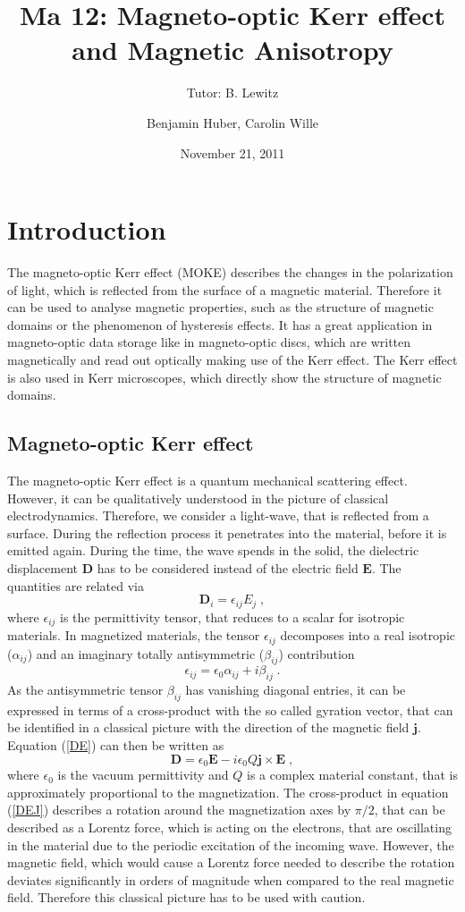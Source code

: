 \documentclass[a4paper]{scrartcl}
\title{Ma 12: Magneto-optic Kerr effect and Magnetic Anisotropy}
\subtitle{Tutor: B. Lewitz}
\author{Benjamin Huber, Carolin Wille}
\date{November 21, 2011}
\numberwithin{equation}{section}
\numberwithin{figure}{section}
\numberwithin{table}{section}
\newcommand{\eq}[2]{\begin{equation}#1\label{#2}\end{equation}}
\newcommand{\Formel}[1]{(\ref{#1})}
\newcommand{\ve}[1]{\mathbf{ #1} }
\begin{document}
\thispagestyle{empty}
\maketitle
\tableofcontents
\clearpage


\section{Introduction}
The magneto-optic Kerr effect (MOKE) describes the changes in the polarization of light, which is reflected from the surface of a magnetic material. Therefore it can be used to analyse magnetic properties, such as the structure of magnetic domains or the phenomenon of hysteresis effects. It has a great application in magneto-optic data storage like in magneto-optic discs, which are written magnetically and read out optically making use of the Kerr effect. The Kerr effect is also used in Kerr microscopes, which directly show the structure of magnetic domains.

\subsection{Magneto-optic Kerr effect}
The magneto-optic Kerr effect is a quantum mechanical scattering effect. However, it can be qualitatively understood in the picture of classical electrodynamics. Therefore, we consider a light-wave, that is reflected from a surface. During the reflection process it
 penetrates into the material, before it is emitted again. During the time, the wave spends in the solid, the dielectric displacement $\ve D $ has to be considered instead of the electric field $\ve E$. The quantities are related via
\eq{\ve D_i = \epsilon_{ij} E_j \;, } {DE}
where $ \epsilon_{ij}$ is the permittivity tensor, that reduces to a scalar for isotropic materials. In magnetized materials, the tensor $\epsilon_{ij}$ decomposes into a real isotropic ($\alpha_{ij}$) and an imaginary totally antisymmetric ($\beta_{ij}$) contribution
\eq{\epsilon_{ij} = \epsilon_0 \alpha_{ij} + i \beta_{ij} \; . }{eps}
As the antisymmetric tensor $\beta_{ij}$ has vanishing diagonal entries, it can be expressed in terms of a cross-product with the so called gyration vector, that can be identified in a classical picture with the direction of the magnetic field $\ve j$. Equation \Formel{DE} can then be written as
\eq{\ve D = \epsilon_0 \ve E - i \epsilon_0 Q \ve j \times \ve E \; , }{DEJ}
where $\epsilon_0$ is the vacuum permittivity and $Q$ is a complex material constant, that is approximately proportional to the magnetization. The cross-product in equation \Formel{DEJ} describes a rotation around the magnetization axes by $\pi/2$, that can be described as a Lorentz force, which is acting on the electrons, that are oscillating in the material due to the periodic excitation of the incoming wave. However, the magnetic field, which would cause a Lorentz force needed to describe the rotation deviates significantly in orders of magnitude when compared to the real magnetic field. Therefore this classical picture has to be used with caution.
\end{document}
